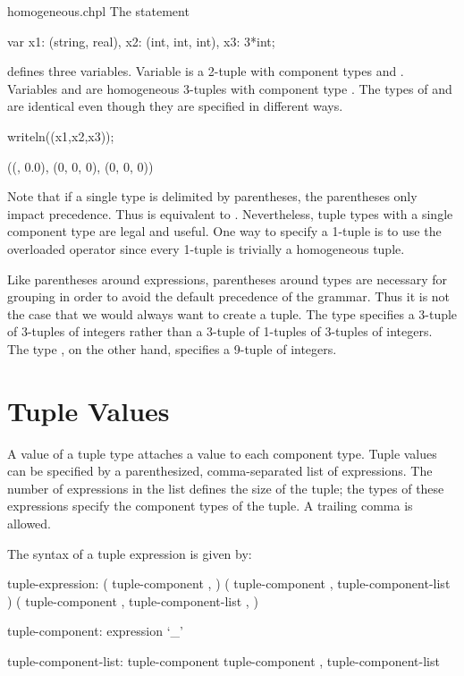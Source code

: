\begin{chapelexample}{homogeneous.chpl}
The statement
\begin{chapel}
var x1: (string, real),
    x2: (int, int, int),
    x3: 3*int;
\end{chapel}
defines three variables.  Variable  is a 2-tuple with
component types  and .  Variables 
and  are homogeneous 3-tuples with component type .
The types of  and  are identical even though they
are specified in different ways.
\begin{chapelpost}
writeln((x1,x2,x3));
\end{chapelpost}
\begin{chapeloutput}
((, 0.0), (0, 0, 0), (0, 0, 0))
\end{chapeloutput}
\end{chapelexample}

Note that if a single type is delimited by parentheses, the
parentheses only impact precedence.  Thus  is equivalent
to .  Nevertheless, tuple types with a single component type
are legal and useful.  One way to specify a 1-tuple is to use the
overloaded \chpl{*} operator since every 1-tuple is trivially a
homogeneous tuple.

\begin{rationale}
Like parentheses around expressions, parentheses around types are
necessary for grouping in order to avoid the default precedence of the
grammar.  Thus it is not the case that we would always want to create
a tuple.  The type  specifies a 3-tuple of 3-tuples of
integers rather than a 3-tuple of 1-tuples of 3-tuples of integers.
The type , on the other hand, specifies a 9-tuple of
integers.
\end{rationale}

\section{Tuple Values}
\label{Tuple_Values}

A value of a tuple type attaches a value to each component type.
Tuple values can be specified by a parenthesized, comma-separated list
of expressions.  The number of expressions in the list defines the
size of the tuple; the types of these expressions specify the
component types of the tuple. A trailing comma is allowed.

The syntax of a tuple expression is given by:
\begin{syntax}
tuple-expression:
  ( tuple-component , )
  ( tuple-component , tuple-component-list )
  ( tuple-component , tuple-component-list , )

tuple-component:
  expression
  `_'

tuple-component-list:
  tuple-component
  tuple-component , tuple-component-list
\end{syntax}

